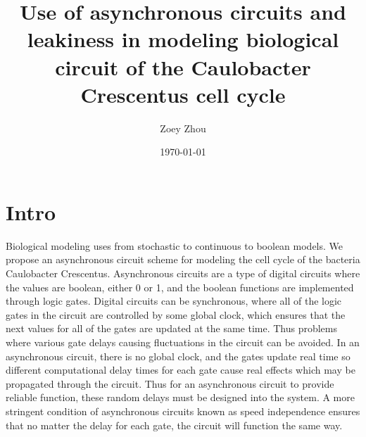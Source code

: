 \documentclass{article}
\title{Use of asynchronous circuits and leakiness in modeling biological circuit of the Caulobacter Crescentus cell cycle}
\author{Zoey Zhou}
\date{\today}
\begin{document}
\maketitle

\section{Intro}
Biological modeling uses from stochastic to continuous to boolean models.  We propose an asynchronous circuit scheme for modeling the cell cycle of the bacteria Caulobacter Crescentus.   Asynchronous circuits are a type of digital circuits where the values are boolean, either 0 or 1, and the boolean functions are implemented through logic gates.  Digital circuits can be synchronous, where all of the logic gates in the circuit are controlled by some global clock, which ensures that the next values for all of the gates are updated at the same time.  Thus problems where various gate delays causing fluctuations in the circuit can be avoided.  In an asynchronous circuit, there is no global clock, and the gates update real time so different computational delay times for each gate cause real effects which may be propagated through the circuit.  Thus for an asynchronous circuit to provide reliable function, these random delays must be designed into the system.  A more stringent condition of asynchronous circuits known as speed independence ensures that no matter the delay for each gate, the circuit will function the same way. 
\end{document}
